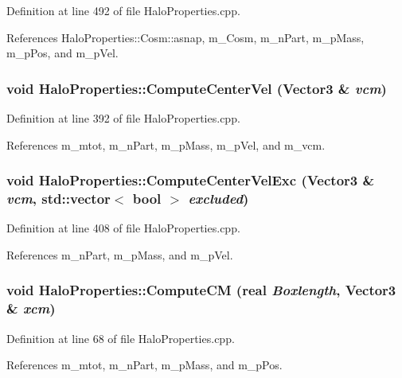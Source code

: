 Definition at line 492 of file HaloProperties.cpp.



References HaloProperties::Cosm::asnap, m\_\-Cosm, m\_\-nPart, m\_\-pMass, m\_\-pPos, and m\_\-pVel.

\subsubsection[{ComputeCenterVel}]{\setlength{\rightskip}{0pt plus 5cm}void HaloProperties::ComputeCenterVel ({\bf Vector3} \& {\em vcm})}\label{classHaloProperties_a1537fda3a25fcde3db6d16bd8ee150b6}


Definition at line 392 of file HaloProperties.cpp.



References m\_\-mtot, m\_\-nPart, m\_\-pMass, m\_\-pVel, and m\_\-vcm.

\subsubsection[{ComputeCenterVelExc}]{\setlength{\rightskip}{0pt plus 5cm}void HaloProperties::ComputeCenterVelExc ({\bf Vector3} \& {\em vcm}, \/  std::vector$<$ bool $>$ {\em excluded})}\label{classHaloProperties_aaf32e9b882dc42e50c5609db83aa4778}


Definition at line 408 of file HaloProperties.cpp.



References m\_\-nPart, m\_\-pMass, and m\_\-pVel.

\subsubsection[{ComputeCM}]{\setlength{\rightskip}{0pt plus 5cm}void HaloProperties::ComputeCM ({\bf real} {\em Boxlength}, \/  {\bf Vector3} \& {\em xcm})}\label{classHaloProperties_a37814d4c30aea13d79fac7f214c1bcb4}


Definition at line 68 of file HaloProperties.cpp.



References m\_\-mtot, m\_\-nPart, m\_\-pMass, and m\_\-pPos.


